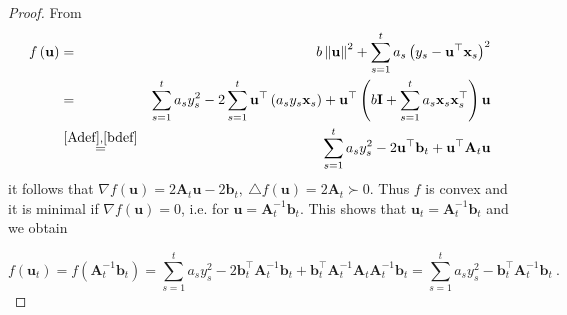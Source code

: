 \begin{proof}
From
\begin{eqnarray*}
f\left(\mathbf{u}\right) & = & b\left\Vert \mathbf{u}\right\Vert ^{2}+\sum_{s=1}^{t}a_{s}\left(y_{s}-\mathbf{u}^{\top}\mathbf{x}_{s}\right)^{2}\\
 & = & \sum_{s=1}^{t}a_{s}y_{s}^{2}-2\sum_{s=1}^{t}\mathbf{u}^{\top}\left(a_{s}y_{s}\mathbf{x}_{s}\right)+\mathbf{u}^{\top}\left(b\mathbf{I}+\sum_{s=1}^{t}a_{s}\mathbf{x}_{s}\mathbf{x}_{s}^{\top}\right)\mathbf{u}\\
 & \overset{\eqref{Adef},\eqref{bdef}}{=} & \sum_{s=1}^{t}a_{s}y_{s}^{2}-2\mathbf{u}^{\top}\mathbf{b}_{t}+\mathbf{u}^{\top}\mathbf{A}_{t}\mathbf{u}
\end{eqnarray*}
it follows that $\nabla
f\left(\mathbf{u}\right)=2\mathbf{A}_{t}\mathbf{u}-2\mathbf{b}_{t},\:
\triangle f(\mathbf{u})=2\mathbf{A}_{t}\succ 0$.
Thus $f$ is convex and it is minimal if $\nabla f\left(\mathbf{u}\right)=0$,
i.e. for $\mathbf{u}=\mathbf{A}_{t}^{-1}\mathbf{b}_{t}$. This shows
that $\mathbf{u}_{t}=\mathbf{A}_{t}^{-1}\mathbf{b}_{t}$ and we obtain

\[
f\left(\mathbf{u}_{t}\right)=f\left(\mathbf{A}_{t}^{-1}\mathbf{b}_{t}\right)=\sum_{s=1}^{t}a_{s}y_{s}^{2}-2\mathbf{b}_{t}^{\top}\mathbf{A}_{t}^{-1}\mathbf{b}_{t}+\mathbf{b}_{t}^{\top}\mathbf{A}_{t}^{-1}\mathbf{A}_{t}\mathbf{A}_{t}^{-1}\mathbf{b}_{t}=\sum_{s=1}^{t}a_{s}y_{s}^{2}-\mathbf{b}_{t}^{\top}\mathbf{A}_{t}^{-1}\mathbf{b}_{t}~.
\]
\QED
\end{proof}
